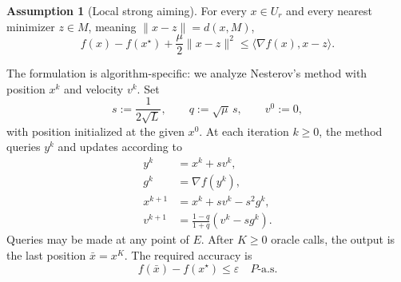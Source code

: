 \documentclass[10pt]{article}
\theoremstyle{definition}
\newtheorem{assumption}{Assumption}
\begin{document}
\begin{assumption}[Local strong aiming]
For every $x\in U_r$ and every nearest minimizer $z\in M$, meaning $\|x-z\|=d(x,M)$,
\[
f(x)-f(x^\star)+\frac{\mu}{2}\|x-z\|^2
\leq\langle\nabla f(x),x-z\rangle.
\]
\end{assumption}

The formulation is algorithm-specific: we analyze Nesterov's method with position $x^k$ and velocity $v^k$. Set
\[
s:=\frac{1}{2\sqrt{L}},\qquad q:=\sqrt{\mu}\,s,
\qquad v^0:=0,
\]
with position initialized at the given $x^0$. At each iteration $k\geq0$, the method queries $y^k$ and updates according to
\[
\begin{aligned}
y^k&=x^k+s v^k,\\
g^k&=\nabla f(y^k),\\
x^{k+1}&=x^k+s v^k-s^2g^k,\\
v^{k+1}&=\frac{1-q}{1+q}(v^k-sg^k).
\end{aligned}
\]
Queries may be made at any point of $E$. After $K\geq0$ oracle calls, the output is the last position $\bar{x}=x^K$. The required accuracy is
\[
f(\bar{x})-f(x^\star)\leq\varepsilon
\quad P\text{-a.s.}
\]
\end{document}
